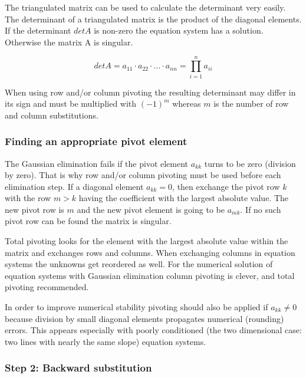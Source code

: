 \documentclass[10pt]{report}
\begin{document}
The triangulated matrix can be used to calculate the determinant very
easily.  The determinant of a triangulated matrix is the product of
the diagonal elements.  If the determinant $det A$ is non-zero the
equation system has a solution.  Otherwise the matrix A is singular.

\begin{equation}
det A = a_{11}\cdot a_{22}\cdot \ldots \cdot a_{nn} = \prod_{i=1}^{n} a_{ii}
\end{equation}

When using row and/or column pivoting the resulting determinant may
differ in its sign and must be multiplied with $(-1)^m$ whereas $m$ is
the number of row and column substitutions.

\subsubsection{Finding an appropriate pivot element}

The Gaussian elimination fails if the pivot element $a_{kk}$ turns to
be zero (division by zero).  That is why row and/or column pivoting
must be used before each elimination step.  If a diagonal element
$a_{kk} = 0$, then exchange the pivot row $k$ with the row $m > k$
having the coefficient with the largest absolute value.  The new pivot
row is $m$ and the new pivot element is going to be $a_{mk}$.  If no
such pivot row can be found the matrix is singular.

\addvspace{12pt}

Total pivoting looks for the element with the largest absolute value
within the matrix and exchanges rows and columns.  When exchanging
columns in equation systems the unknowns get reordered as well.  For
the numerical solution of equation systems with Gaussian elimination
column pivoting is clever, and total pivoting recommended.

\addvspace{12pt}

In order to improve numerical stability pivoting should also be
applied if $a_{kk} \ne 0$ because division by small diagonal elements
propagates numerical (rounding) errors.  This appears especially with
poorly conditioned (the two dimensional case: two lines with nearly
the same slope) equation systems.

\subsubsection{Step 2: Backward substitution}
\end{document}
